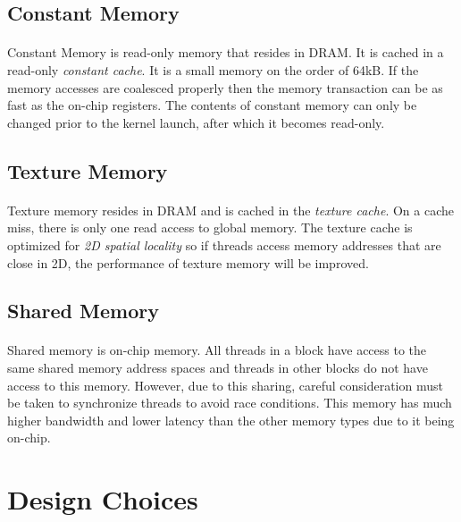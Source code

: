 \documentclass[10pt]{article}
\begin{document}
	 \subsection{Constant Memory}
	 
	 \paragraph{}Constant Memory is read-only memory that resides in DRAM. It is cached in a read-only \emph{constant cache}. It is a small memory on the order of 64kB. If the memory accesses are coalesced properly then the memory transaction can be as fast as the on-chip registers. The contents of constant memory can only be changed prior to the kernel launch, after which it becomes read-only.
	 
	\subsection{Texture Memory}
	
		\paragraph{} Texture memory resides in DRAM and is cached in the \emph{texture cache}. On a cache miss, there is only one read access to global memory. The texture cache is optimized for \emph{2D spatial locality} so if threads access memory addresses that are close in 2D, the performance of texture memory will be improved.
		
	\subsection{Shared Memory}
	
	\paragraph{} Shared memory is on-chip memory. All threads in a block have access to the same shared memory address spaces and threads in other blocks do not have access to this memory. However, due to this sharing, careful consideration must be taken to synchronize threads to avoid race conditions. This memory has much higher bandwidth and lower latency than the other memory types due to it being on-chip.   
	
	\section{Design Choices}
	
\end{document}
